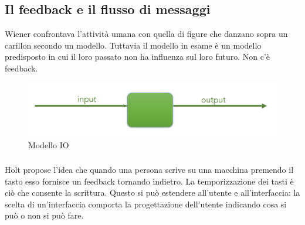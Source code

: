 \subsection{Il feedback e il flusso di messaggi}
\label{feedback}
Wiener confrontava l'attività umana con quella di figure che danzano sopra
un carillon secondo un modello. Tuttavia il modello in esame è un modello
predisposto in cui il loro passato non ha influenza sul loro futuro. Non 
c'è feedback.

\begin{figure}[h]
    \centering
    \includegraphics[scale=0.35]{images/IO.png}
    \caption{Modello IO}
\end{figure}

\subsubsection{}

Holt propose l'idea che quando una persona scrive su una macchina premendo il tasto
esso fornisce un feedback tornando indietro. La temporizzazione dei tasti è
ciò che consente la scrittura.
Questo si può estendere all'utente e all'interfaccia: la scelta di un'interfaccia comporta
la progettazione dell'utente indicando cosa si può o non si può fare.


